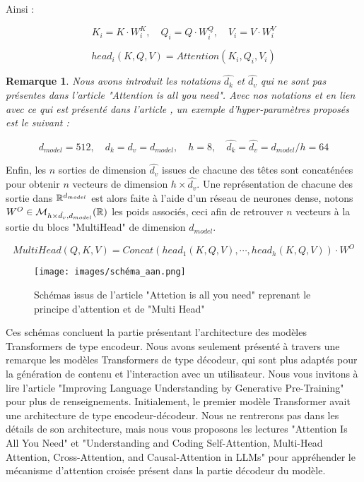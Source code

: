 \documentclass[12pt]{article}
\newtheorem{rmq}{Remarque}
\theoremstyle{definition}
\begin{document}
Ainsi : 

$$K_i = K\cdot W_i^K ,\quad  Q_i = Q\cdot W_i^Q ,\quad  V_i = V \cdot W_i^V $$

$$head_i(K,Q,V) = Attention(K_i,Q_i,V_i) $$

\newpage 
\begin{rmq}
	Nous avons introduit les notations $\hat{d_k}$ et  $\hat{d_v}$ qui ne sont pas présentes dans l'article "Attention is all you need". Avec nos notations et en lien avec ce qui est présenté dans l'article \cite{a_i_a_y_n}, un exemple d'hyper-paramètres proposés est le suivant : 
	
	$$d_{model} = 512, \quad d_k= d_v= d_{model}, \quad h=8, \quad \hat{d_k} = \hat{d_v} = d_{model}/h = 64  $$
\end{rmq}

Enfin, les $n$ sorties de dimension $\hat{d_v}$ issues de chacune des têtes sont concaténées pour obtenir $n$ vecteurs de dimension $h\times\hat{d_v}$. Une représentation de chacune des sortie dans $\mathbb{R}^{d_{model}}$ est alors faite à l'aide d'un réseau de neurones dense, notons $W^O\in\mathcal{M}_{h\times\hat{d_v},d_{model} }(\mathbb{R})$ les poids associés, ceci afin de retrouver $n$ vecteurs à la sortie du blocs "MultiHead" de dimension $d_{model}$.

$$MultiHead(Q,K,V) = Concat(head_1(K,Q,V), \cdots , head_h(K,Q,V)) \cdot W^O$$ 

\begin{figure*}[!h]
	\centering
	\texttt{[image: images/schéma\_aan.png]}
	\caption{Schémas issus de l'article "Attetion is all you need" \cite{a_i_a_y_n} reprenant le principe d'attention et de "Multi Head"}
\end{figure*}

Ces schémas concluent la partie présentant l'architecture des modèles Transformers de type encodeur. Nous avons seulement présenté à travers une remarque les modèles Transformers de type décodeur, qui sont plus adaptés pour la génération de contenu et l'interaction avec un utilisateur. Nous vous invitons à lire l'article "Improving Language Understanding by Generative Pre-Training" \cite{openai_gpt} pour plus de renseignements. Initialement, le premier modèle Transformer avait une architecture de type encodeur-décodeur. Nous ne rentrerons pas dans les détails de son architecture, mais nous vous proposons les lectures "Attention Is All You Need" \cite{a_i_a_y_n} et "Understanding and Coding Self-Attention, Multi-Head Attention, Cross-Attention, and Causal-Attention in LLMs" \cite{und_code_sa} pour appréhender le mécanisme d'attention croisée présent dans la partie décodeur du modèle.
\end{document}
